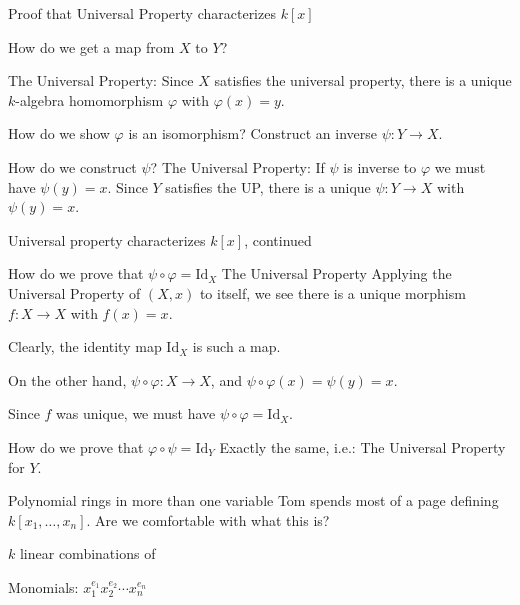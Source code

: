 \documentclass{beamer}
\begin{document}
\begin{frame}{Proof that Universal Property characterizes $k[x]$}

\begin{block}{How do we get a map from $X$ to $Y$?}

\alert{The Universal Property:} Since $X$ satisfies the universal property, there is a unique $k$-algebra homomorphism $\varphi$ with $\varphi(x)=y$.
\end{block}

\begin{block}{How do we show $\varphi$ is an isomorphism?}
Construct an inverse $\psi:Y\to X$.
\end{block}

\begin{block}{How do we construct $\psi$?}
\alert{The Universal Property:} If $\psi$ is inverse to $\varphi$ we must have $\psi(y)=x$.  Since $Y$ satisfies the UP, there is a unique $\psi:Y\to X$ with $\psi(y)=x$.  
\end{block}
\end{frame}




\begin{frame}{Universal property characterizes $k[x]$, continued}

\begin{block}{How do we prove that $\psi\circ\varphi=\textrm{Id}_X$}
\alert{The Universal Property} Applying the Universal Property of $(X,x)$ to itself, we see there is a \alert{unique} morphism $f:X\to X$ with $f(x)=x$. 

Clearly, the identity map $\textrm{Id}_X$ is such a map.

On the other hand, $\psi\circ\varphi:X\to X$, and  $\psi\circ\varphi(x)=\psi(y)=x$. 

Since $f$ was unique, we must have $\psi\circ\varphi=\textrm{Id}_X$.
\end{block}

\begin{block}{How do we prove that $\varphi\circ\psi=\textrm{Id}_Y$}
Exactly the same, i.e.: \alert{The Universal Property} for $Y$.
\end{block}

\end{frame}





\begin{frame}{Polynomial rings in more than one variable}
Tom spends most of a page defining $k[x_1,\dots, x_n]$.  Are we comfortable with what this is?

$k$ linear combinations of 

Monomials: $x_1^{e_1}x_2^{e_2}\cdots x_n^{e_n}$



\end{frame}
\end{document}
